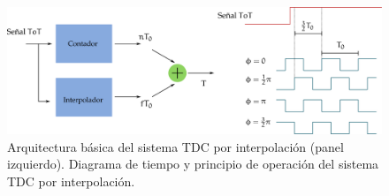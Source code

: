 \begin{figure}
        \centering
        \includegraphics[width=\textwidth]{tdc-diagram.pdf}
        \caption{Arquitectura básica del sistema TDC por interpolación (panel izquierdo). Diagrama de tiempo y principio de operación del sistema TDC por interpolación.}
        \label{fig:tdc-diagram}
\end{figure}
